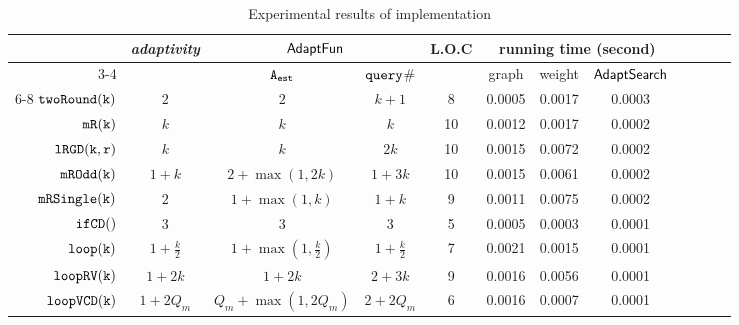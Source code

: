 {
\begin {table}[H]
    \caption{Experimental results of {\THESYSTEM} implementation}
        \label{tb:adapt-imp}
        \begin{center}
        \centering
{\scriptsize
        \begin{tabular}{| >{\tiny}r | c | c | c | c | c | c | c | c | c | c | c }
         \hline \hline
        \multirow{2}{*}{Program $c$} & 
        \multirow{2}{*}{\emph{adaptivity}}
         & \multicolumn{2}{c|}{$\textsf{AdaptFun}$}
         & \multirow{2}{*}{L.O.C}
         & \multicolumn{3}{c|}{running time (second)} \\ 
         \cline{3-4}\cline{6-8}
         & & {${\mathtt{A_{est}}}$ } & {${\tt query}$\# } &  & graph & weight & $\mathsf{AdaptSearch}$ \\ 
         \cline{6-8}
         \hline \hline
         $  \mathtt{twoRound(k)}$ & $2$ &  $2$ & $k+1 $  & 8 & 0.0005 & 0.0017 & 0.0003 \\
         $  \mathtt{mR(k)}$ & $k$ &  $k$ & $k$  &  10 & 0.0012 & 0.0017  & 0.0002 \\
         $  \mathtt{lRGD(k, r)}$ & $k$ & $k  $ & $ 2k $  &  10 & 0.0015 & 0.0072  & 0.0002  \\
         $  \mathtt{mROdd(k)}$ & $1 + k$ &  $2+\max(1,2k)  $ & $1 + 3 k  $  &  10 & 0.0015 & 0.0061  & 0.0002 \\
         $  \mathtt{mRSingle(k)}$    & $2$ &  $1+ \max(1, k) $ & $1 + k $  &  9 & 0.0011 & 0.0075  & 0.0002 \\
         $  \mathtt{ifCD()}$ & $3$ & $3 $ &   $3$  & 5 & 0.0005 & 0.0003   & 0.0001 \\
         $  \mathtt{loop(k)}$ & $1+\frac{k}{2}$ &   $1 +\max(1, \frac{k}{2})  $  &  $1+\frac{k}{2}  $ & 7 & 0.0021 & 0.0015 &  0.0001 \\
         $  \mathtt{loopRV(k)}$ & $1 + 2k$ &  $1 + 2k$ & $2 + 3 k$  &  9 & 0.0016 & 0.0056 & 0.0001  \\
         $  {\mathtt{loopVCD(k)}} $ & ${1 + 2Q_m}$ &  ${Q_m+\max(1,2Q_m)}$  & $2+2Q_m$   &  6 & 0.0016 & 0.0007 & 0.0001 \\

\end{tabular}}
\end{center}
\end{table}}
